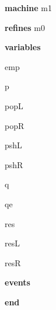 \begin{block}
  \item   \textbf{machine} m1
  \item   \textbf{refines} m0
  \item   \textbf{variables}
  \begin{block}
    \item   emp
    \item   \begin{block}
      \item   {}
    \end{block}
    \item   p
    \item   popL
    \item   popR
    \item   pshL
    \item   pshR
    \item   q
    \item   qe
    \item   res
    \item   resL
    \item   resR
  \end{block}
  \item   
  \item   
  \item   \textbf{events}
  \begin{block}
    \item   
    \item   
    \item   
    \item   
    \item   
    \item   
  \end{block}
  \item   \textbf{end} \\
\end{block}
